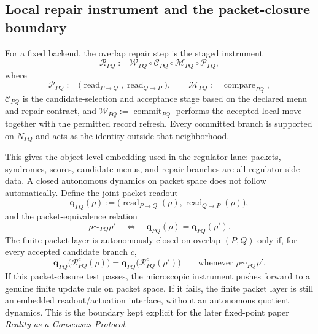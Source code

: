 \documentclass[11pt]{article}
\begin{document}
\subsection{Local repair instrument and the packet-closure boundary}

For a fixed backend, the overlap repair step is the staged instrument
\begin{equation}
\mathcal R_{PQ}
:=
\mathcal W_{PQ}\circ \mathcal C_{PQ}\circ \mathcal M_{PQ}\circ \mathcal P_{PQ},
\end{equation}
where
\begin{equation}
\mathcal P_{PQ}:=\bigl(\operatorname{read}_{P\to Q},\operatorname{read}_{Q\to P}\bigr),
\qquad
\mathcal M_{PQ}:=\operatorname{compare}_{PQ},
\end{equation}
$\mathcal C_{PQ}$ is the candidate-selection and acceptance stage based on the declared menu and
repair contract, and $\mathcal W_{PQ}:=\operatorname{commit}_{PQ}$ performs the accepted local
move together with the permitted record refresh. Every committed branch is supported on $N_{PQ}$
and acts as the identity outside that neighborhood.

This gives the object-level embedding used in the regulator lane: packets, syndromes,
scores, candidate menus, and repair branches are all regulator-side data. A closed autonomous
dynamics on packet space does not follow automatically. Define the joint
packet readout
\begin{equation}
\mathbf q_{PQ}(\rho)
:=
\bigl(
\operatorname{read}_{P\to Q}(\rho),
\operatorname{read}_{Q\to P}(\rho)
\bigr),
\end{equation}
and the packet-equivalence relation
\begin{equation}
\rho\sim_{PQ}\rho'
\quad\Longleftrightarrow\quad
\mathbf q_{PQ}(\rho)=\mathbf q_{PQ}(\rho').
\end{equation}
The finite packet layer is autonomously closed on overlap $(P,Q)$ only if, for every accepted
candidate branch $c$,
\begin{equation}
\mathbf q_{PQ}\bigl(\mathcal R_{PQ}^{c}(\rho)\bigr)
=
\mathbf q_{PQ}\bigl(\mathcal R_{PQ}^{c}(\rho')\bigr)
\qquad
\text{whenever }\rho\sim_{PQ}\rho'.
\end{equation}
If this packet-closure test passes, the microscopic instrument pushes forward to a genuine
finite update rule on packet space. If it fails, the finite packet layer is still an embedded
readout/actuation interface, without an autonomous quotient dynamics. This is the boundary kept
explicit for the later fixed-point paper \emph{Reality as a Consensus Protocol}.
\end{document}
